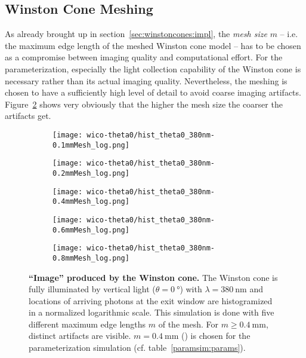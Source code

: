 \subsection{Winston Cone Meshing}\label{sec:wico_meshing}

As already brought up in section~\ref{sec:winstoncones:impl}, the \textit{mesh size} $m$ -- i.e. the maximum edge length of the meshed Winston cone model -- has to be chosen as a compromise between imaging quality and computational effort. For the \iceact parameterization, especially the light collection capability of the Winston cone is necessary rather than its actual imaging quality. Nevertheless, the meshing is chosen to have a sufficiently high level of detail to avoid coarse imaging artifacts. Figure~\ref{wico:theta0_image} shows very obviously that the higher the mesh size the coarser the artifacts get. 

\begin{figure}[H]
	\centering
	\begin{subfigure}[t]{0.495\textwidth}
		\texttt{[image: wico-theta0/hist\_theta0\_380nm-0.1mmMesh\_log.png]}
	\end{subfigure}
	\hfill
	\begin{subfigure}[t]{0.495\textwidth}
		\texttt{[image: wico-theta0/hist\_theta0\_380nm-0.2mmMesh\_log.png]}
	\end{subfigure}
	\vfill
	\begin{subfigure}[t]{0.495\textwidth}
		\texttt{[image: wico-theta0/hist\_theta0\_380nm-0.4mmMesh\_log.png]}
		\label{wico:theta0_image:m04}
	\end{subfigure}
	\hfill
	\begin{subfigure}[t]{0.495\textwidth}
		\texttt{[image: wico-theta0/hist\_theta0\_380nm-0.6mmMesh\_log.png]}
	\end{subfigure}
	\hfill
	\begin{subfigure}[t]{0.495\textwidth}
		\texttt{[image: wico-theta0/hist\_theta0\_380nm-0.8mmMesh\_log.png]}
	\end{subfigure}
	\hfill
	\begin{minipage}[t]{0.495\textwidth}
		\vspace{-190pt}
		\caption[\enquote{Image} produced by the \iceact Winston cone]{\textbf{\enquote{Image} produced by the \iceact Winston cone.} The Winston cone is fully illuminated by vertical light ($\theta=\SI{0}{\degree}$) with $\lambda=\SI{380}{\nano\meter}$ and locations of arriving photons at the exit window are histogramized in a normalized logarithmic scale. This simulation is done with five different maximum edge lengths $m$ of the mesh. For $m\geq\SI{0.4}{\milli\meter}$, distinct artifacts are visible. $m=\SI{0.4}{\milli\meter}$ () is chosen for the parameterization simulation (cf. table~\ref{paramsim:params}).}
	\end{minipage}
	\label{wico:theta0_image}
\end{figure}

